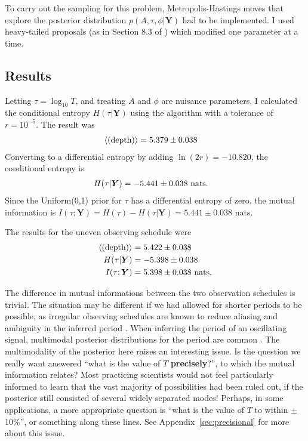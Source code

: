 \documentclass[entropy,article,accept,oneauthor,pdftex,10pt,a4paper]{mdpi}
\newcommand{\revision}{\color{darkblue}}
\newcommand{\depth}{(\textnormal{depth})}
\begin{document}
To carry out the sampling for this problem, Metropolis-Hastings moves that
explore the posterior distribution $p(A, \tau, \phi | \boldsymbol{Y})$
had to be implemented. I used heavy-tailed proposals (as in
Section 8.3 of \citet{dnest4}) which modified one parameter at a time.

\subsection{Results}

Letting $\tau = \log_{10} T$, and treating
$A$ and $\phi$ are nuisance parameters, I calculated the conditional entropy
$H(\tau | \boldsymbol{Y})$ using the algorithm with a tolerance of $r = 10^{-5}$.
The result was
\begin{align}
\left<\depth\right> &= 5.379 \pm 0.038
\end{align}
Converting to a differential entropy by adding {\revision $\ln (2r) = -10.820$}, the conditional
entropy is
\begin{align}
H(\tau | \boldsymbol{Y}) &= -5.441 \pm 0.038 \textnormal{ nats}.
\end{align}
Since the Uniform(0,1) prior for $\tau$ has a differential entropy of zero, the
mutual information is $I(\tau; \boldsymbol{Y}) = H(\tau) - H(\tau | \boldsymbol{Y}) = 5.441 \pm 0.038$
nats.

The results for the uneven observing schedule were
\begin{align}
\left<\depth\right>       &=  5.422 \pm 0.038 \\
H(\tau | \boldsymbol{Y}) &= -5.398 \pm 0.038 \\
I(\tau; \boldsymbol{Y})   &=  5.398 \pm 0.038 \textnormal{ nats}.
\end{align}

The difference in mutual informations between the two observation
schedules is trivial.
The situation may be different if we
had allowed for shorter periods to be possible, as irregular observing
schedules are known to reduce aliasing and ambiguity in the inferred period
\citep{bretthorst2001nonuniform}.
When inferring the period of an oscillating signal, multimodal posterior
distributions for the period are common \citep{gregoryTrimodal, exoplanet}.
The multimodality of the posterior here raises an interesting issue. Is
the question we really want answered ``what is the value of $T$
{\bf precisely}?'', to which the mutual information relates?
Most practicing scientists would not feel particularly informed to learn
that the vast majority of possibilities had been ruled out, if the
posterior still consisted of several widely separated modes!
Perhaps, in some applications, a more appropriate question is
``what is the value of $T$ to within $\pm$ 10\%'', or something along these
lines. See Appendix~\ref{sec:precisional} for more about this
issue.
\end{document}
